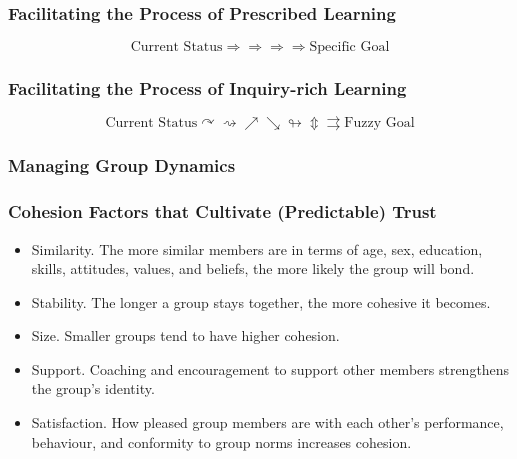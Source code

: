\documentclass[
]{book}
\providecommand{\tightlist}{%
  \setlength{\itemsep}{0pt}\setlength{\parskip}{0pt}}
\begin{document}
\hypertarget{facilitating-the-process-of-prescribed-learning}{%
\subsubsection*{Facilitating the Process of Prescribed Learning}\label{facilitating-the-process-of-prescribed-learning}}

\[\text{Current Status}\Longrightarrow \Longrightarrow \Longrightarrow \Longrightarrow \text{Specific Goal}\]

\hypertarget{facilitating-the-process-of-inquiry-rich-learning}{%
\subsubsection*{Facilitating the Process of Inquiry-rich Learning}\label{facilitating-the-process-of-inquiry-rich-learning}}

\[\text{Current Status} \curvearrowright \rightsquigarrow\nearrow\searrow\looparrowright\Updownarrow\rightrightarrows\text{Fuzzy Goal}\]

\hypertarget{managing-group-dynamics}{%
\subsubsection*{Managing Group Dynamics}\label{managing-group-dynamics}}

\hypertarget{cohesion-factors-that-cultivate-predictable-trust}{%
\subsubsection*{Cohesion Factors that Cultivate (Predictable) Trust}\label{cohesion-factors-that-cultivate-predictable-trust}}

\begin{itemize}
\tightlist
\item
  Similarity. The more similar members are in terms of age, sex, education, skills, attitudes, values, and beliefs, the more likely the group will bond.
\item
  Stability. The longer a group stays together, the more cohesive it becomes.
\item
  Size. Smaller groups tend to have higher cohesion.
\item
  Support. Coaching and encouragement to support other members strengthens the group's identity.
\item
  Satisfaction. How pleased group members are with each other's performance, behaviour, and conformity to group norms increases cohesion.
\end{itemize}
\end{document}

